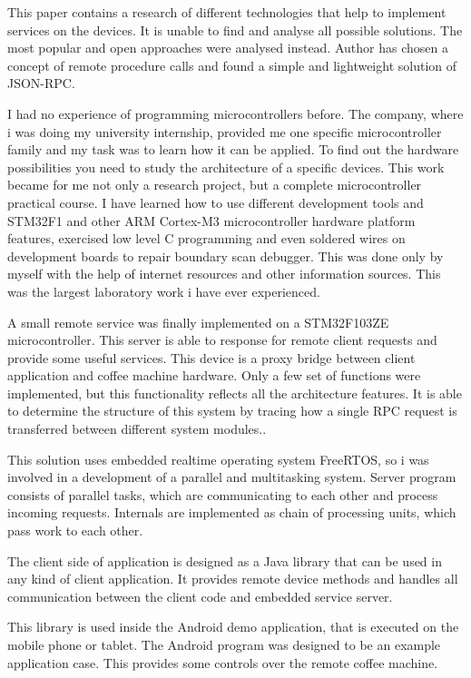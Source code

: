 This paper contains a research of different technologies that help to implement
services on the devices.
It is unable to find and analyse all possible solutions. The most popular and
open approaches were analysed instead. 
Author has chosen a concept of remote procedure calls and found a simple
and lightweight solution of JSON-RPC. 

I had no experience of programming microcontrollers before. The company, where i
was doing my university internship, provided me one specific microcontroller
family and my task was to learn how it can be applied. To find out the
hardware possibilities you need to study the  architecture of a specific
devices.
This work became for me not only a research project, but  a complete
microcontroller practical course.
I have learned how to use different development tools and STM32F1 and other ARM
Cortex-M3 microcontroller hardware platform features, exercised low level C
programming and even soldered wires on development boards to repair boundary
scan debugger.
This was done only by myself with the help of internet resources
and other information sources.
This was the largest laboratory work i have ever experienced.

A small remote service was finally implemented on a STM32F103ZE microcontroller. 
This server is able to response for remote client requests and provide some
useful services.
This device is a proxy bridge between client application and coffee machine
hardware.
Only a few set of functions were implemented, but this functionality reflects all
the architecture features.
It is able to determine the structure of this system by tracing how a
single RPC request is transferred between different system modules..

This solution uses embedded realtime operating system FreeRTOS, so i was
involved in a development of a parallel and multitasking system. 
Server program consists of parallel tasks, which are communicating to each other
and process incoming requests. Internals are implemented as chain of
processing units, which pass work to each other.

The client side of application is designed as a Java library that can be used
in any kind of client application. It provides remote device methods and handles
all communication between the client code and embedded service server.

This library  is used inside the Android demo application, that is executed on
the mobile phone or tablet.
The Android program was designed to be an example application case. 
This provides some controls over the remote coffee machine. 


